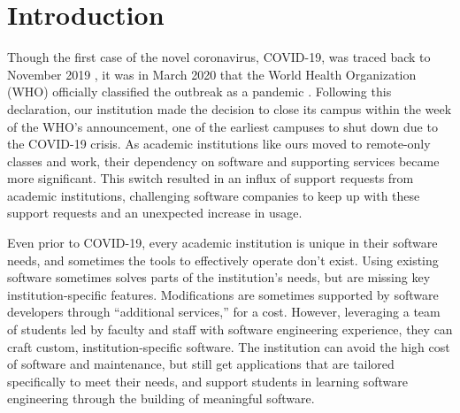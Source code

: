 \section{Introduction}


Though the first case of the novel coronavirus, COVID-19, was traced back to November 2019 \cite{}, it was in March 2020 that the World Health Organization (WHO) officially classified the outbreak as a pandemic \cite{}. Following this declaration, our institution made the decision to close its campus within the week of the WHO's announcement, one of the earliest campuses to shut down due to the COVID-19 crisis. As academic institutions like ours moved to remote-only classes and work, their dependency on software and supporting services became more significant. This switch resulted in an influx of support requests from academic institutions, challenging software companies to keep up with these support requests and an unexpected increase in usage.

Even prior to COVID-19, every academic institution is unique in their software needs, and sometimes the tools to effectively operate don't exist. Using existing software sometimes solves parts of the institution's needs, but are missing key institution-specific features. Modifications are sometimes supported by software developers through ``additional services,'' for a cost. However, leveraging a team of students led by faculty and staff with software engineering experience, they can craft custom, institution-specific software. The institution can avoid the high cost of software and maintenance, but still get applications that are tailored specifically to meet their needs, and support students in learning software engineering through the building of meaningful software.


